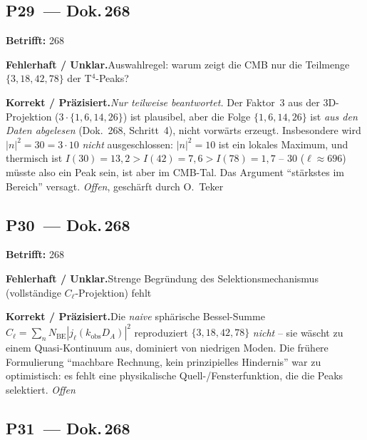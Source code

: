 \medskip


\subsection*{P29~--- Dok.\,268}

\noindent\textbf{Betrifft:} 268


\smallskip\noindent\textbf{Fehlerhaft / Unklar.}\quad Auswahlregel: warum zeigt die CMB nur die Teilmenge $\{3,18,42,78\}$ der T$^4$-Peaks?


\smallskip\noindent\textbf{Korrekt / Präzisiert.}\quad \emph{Nur teilweise beantwortet.} Der Faktor~3 aus der 3D-Projektion ($3\cdot\{1,6,14,26\}$) ist plausibel, aber die Folge $\{1,6,14,26\}$ ist \emph{aus den Daten abgelesen} (Dok.~268, Schritt~4), nicht vorwärts erzeugt. Insbesondere wird $|n|^2=30=3\cdot10$ \emph{nicht} ausgeschlossen: $|n|^2=10$ ist ein lokales Maximum, und thermisch ist $I(30)=13{,}2 > I(42)=7{,}6 > I(78)=1{,}7$ -- $30$ ($\ell\approx696$) müsste also ein Peak sein, ist aber im CMB-Tal. Das Argument ``stärkstes im Bereich'' versagt. \emph{Offen}, geschärft durch O.~Teker


\medskip


\subsection*{P30~--- Dok.\,268}

\noindent\textbf{Betrifft:} 268


\smallskip\noindent\textbf{Fehlerhaft / Unklar.}\quad Strenge Begründung des Selektionsmechanismus (vollständige $C_\ell$-Projektion) fehlt


\smallskip\noindent\textbf{Korrekt / Präzisiert.}\quad Die \emph{naive} sphärische Bessel-Summe $C_\ell=\sum_n N_\mathrm{BE}|j_\ell(k_\mathrm{obs}D_A)|^2$ reproduziert $\{3,18,42,78\}$ \emph{nicht} -- sie wäscht zu einem Quasi-Kontinuum aus, dominiert von niedrigen Moden. Die frühere Formulierung ``machbare Rechnung, kein prinzipielles Hindernis'' war zu optimistisch: es fehlt eine physikalische Quell-/Fensterfunktion, die die Peaks selektiert. \emph{Offen}


\medskip


\subsection*{P31~--- Dok.\,268}

